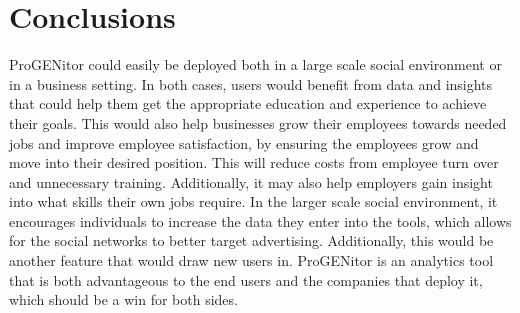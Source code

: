 \section{Conclusions}
\label{sect:conclusions}
ProGENitor could easily be deployed both in a large scale social environment or
in a business setting.  In both cases, users would benefit from data and
insights that could help them get the appropriate education and experience to
achieve their goals.  This would also help businesses grow their employees
towards needed jobs and improve employee satisfaction, by ensuring the employees
grow and move into their desired position.  This will reduce costs from
employee turn over and unnecessary training.  Additionally, it may also help
employers gain insight into what skills their own jobs require.  In the larger
scale social environment, it encourages individuals to increase the data they
enter into the tools, which allows for the social networks to better target
advertising.  Additionally, this would be another feature that would draw new
users in.  ProGENitor is an analytics tool that is both advantageous to the
end users and the companies that deploy it, which should be a win for both
sides.

